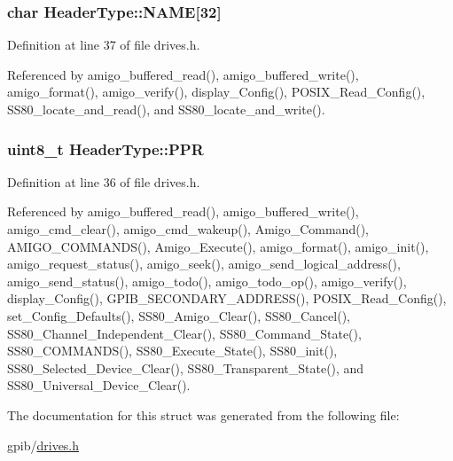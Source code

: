 \subsubsection[{\texorpdfstring{N\+A\+ME}{NAME}}]{\setlength{\rightskip}{0pt plus 5cm}char Header\+Type\+::\+N\+A\+ME\mbox{[}32\mbox{]}}\hypertarget{structHeaderType_aab6f096f40fee03da66178f67c730ff9}{}\label{structHeaderType_aab6f096f40fee03da66178f67c730ff9}


Definition at line 37 of file drives.\+h.



Referenced by amigo\+\_\+buffered\+\_\+read(), amigo\+\_\+buffered\+\_\+write(), amigo\+\_\+format(), amigo\+\_\+verify(), display\+\_\+\+Config(), P\+O\+S\+I\+X\+\_\+\+Read\+\_\+\+Config(), S\+S80\+\_\+locate\+\_\+and\+\_\+read(), and S\+S80\+\_\+locate\+\_\+and\+\_\+write().

\subsubsection[{\texorpdfstring{P\+PR}{PPR}}]{\setlength{\rightskip}{0pt plus 5cm}uint8\+\_\+t Header\+Type\+::\+P\+PR}\hypertarget{structHeaderType_ac642cdad0f3874495afa0ab687a56fd0}{}\label{structHeaderType_ac642cdad0f3874495afa0ab687a56fd0}


Definition at line 36 of file drives.\+h.



Referenced by amigo\+\_\+buffered\+\_\+read(), amigo\+\_\+buffered\+\_\+write(), amigo\+\_\+cmd\+\_\+clear(), amigo\+\_\+cmd\+\_\+wakeup(), Amigo\+\_\+\+Command(), A\+M\+I\+G\+O\+\_\+\+C\+O\+M\+M\+A\+N\+D\+S(), Amigo\+\_\+\+Execute(), amigo\+\_\+format(), amigo\+\_\+init(), amigo\+\_\+request\+\_\+status(), amigo\+\_\+seek(), amigo\+\_\+send\+\_\+logical\+\_\+address(), amigo\+\_\+send\+\_\+status(), amigo\+\_\+todo(), amigo\+\_\+todo\+\_\+op(), amigo\+\_\+verify(), display\+\_\+\+Config(), G\+P\+I\+B\+\_\+\+S\+E\+C\+O\+N\+D\+A\+R\+Y\+\_\+\+A\+D\+D\+R\+E\+S\+S(), P\+O\+S\+I\+X\+\_\+\+Read\+\_\+\+Config(), set\+\_\+\+Config\+\_\+\+Defaults(), S\+S80\+\_\+\+Amigo\+\_\+\+Clear(), S\+S80\+\_\+\+Cancel(), S\+S80\+\_\+\+Channel\+\_\+\+Independent\+\_\+\+Clear(), S\+S80\+\_\+\+Command\+\_\+\+State(), S\+S80\+\_\+\+C\+O\+M\+M\+A\+N\+D\+S(), S\+S80\+\_\+\+Execute\+\_\+\+State(), S\+S80\+\_\+init(), S\+S80\+\_\+\+Selected\+\_\+\+Device\+\_\+\+Clear(), S\+S80\+\_\+\+Transparent\+\_\+\+State(), and S\+S80\+\_\+\+Universal\+\_\+\+Device\+\_\+\+Clear().



The documentation for this struct was generated from the following file\+:\begin{DoxyCompactItemize}
\item 
gpib/\hyperlink{drives_8h}{drives.\+h}\end{DoxyCompactItemize}
